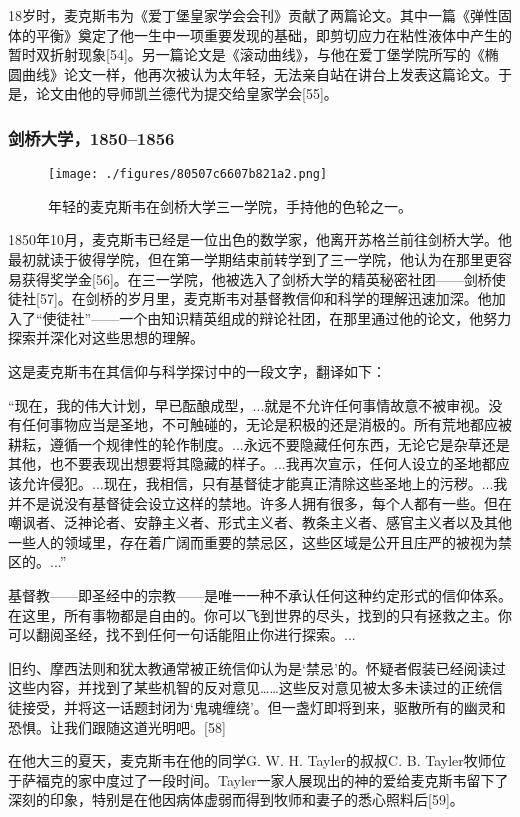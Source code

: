 18岁时，麦克斯韦为《爱丁堡皇家学会会刊》贡献了两篇论文。其中一篇《弹性固体的平衡》奠定了他一生中一项重要发现的基础，即剪切应力在粘性液体中产生的暂时双折射现象[54]。另一篇论文是《滚动曲线》，与他在爱丁堡学院所写的《椭圆曲线》论文一样，他再次被认为太年轻，无法亲自站在讲台上发表这篇论文。于是，论文由他的导师凯兰德代为提交给皇家学会[55]。
\subsubsection{剑桥大学，1850–1856}
\begin{figure}[ht]
\centering
\texttt{[image: ./figures/80507c6607b821a2.png]}
\caption{年轻的麦克斯韦在剑桥大学三一学院，手持他的色轮之一。} \label{fig_Clerk_2}
\end{figure}
1850年10月，麦克斯韦已经是一位出色的数学家，他离开苏格兰前往剑桥大学。他最初就读于彼得学院，但在第一学期结束前转学到了三一学院，他认为在那里更容易获得奖学金[56]。在三一学院，他被选入了剑桥大学的精英秘密社团——剑桥使徒社[57]。在剑桥的岁月里，麦克斯韦对基督教信仰和科学的理解迅速加深。他加入了“使徒社”——一个由知识精英组成的辩论社团，在那里通过他的论文，他努力探索并深化对这些思想的理解。

这是麦克斯韦在其信仰与科学探讨中的一段文字，翻译如下：

“现在，我的伟大计划，早已酝酿成型，...就是不允许任何事情故意不被审视。没有任何事物应当是圣地，不可触碰的，无论是积极的还是消极的。所有荒地都应被耕耘，遵循一个规律性的轮作制度。...永远不要隐藏任何东西，无论它是杂草还是其他，也不要表现出想要将其隐藏的样子。...我再次宣示，任何人设立的圣地都应该允许侵犯。...现在，我相信，只有基督徒才能真正清除这些圣地上的污秽。...我并不是说没有基督徒会设立这样的禁地。许多人拥有很多，每个人都有一些。但在嘲讽者、泛神论者、安静主义者、形式主义者、教条主义者、感官主义者以及其他一些人的领域里，存在着广阔而重要的禁忌区，这些区域是公开且庄严的被视为禁区的。...”

基督教——即圣经中的宗教——是唯一一种不承认任何这种约定形式的信仰体系。在这里，所有事物都是自由的。你可以飞到世界的尽头，找到的只有拯救之主。你可以翻阅圣经，找不到任何一句话能阻止你进行探索。...

旧约、摩西法则和犹太教通常被正统信仰认为是‘禁忌’的。怀疑者假装已经阅读过这些内容，并找到了某些机智的反对意见……这些反对意见被太多未读过的正统信徒接受，并将这一话题封闭为‘鬼魂缠绕’。但一盏灯即将到来，驱散所有的幽灵和恐惧。让我们跟随这道光明吧。[58]

在他大三的夏天，麦克斯韦在他的同学G. W. H. Tayler的叔叔C. B. Tayler牧师位于萨福克的家中度过了一段时间。Tayler一家人展现出的神的爱给麦克斯韦留下了深刻的印象，特别是在他因病体虚弱而得到牧师和妻子的悉心照料后[59]。

